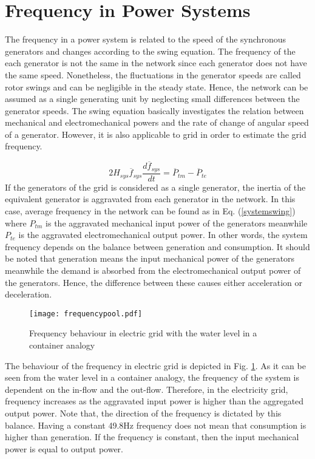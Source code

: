 \section{Frequency in Power Systems}
The frequency in a power system is related to the speed of the synchronous generators and changes according to the swing equation. The frequency of the each generator is not the same in the network since each generator does not have the same speed. Nonetheless, the fluctuations in the generator speeds are called rotor swings and can be negligible in the steady state. Hence, the network can be assumed as a single generating unit by neglecting small differences between the generator speeds. The swing equation basically investigates the relation between mechanical and electromechanical powers and the rate of change of angular speed of a generator. However, it is also applicable to grid in order to estimate the grid frequency.\par
\begin{equation}
\label{systemswing}
2H_{sys}\overline{f}_{sys}\frac{d\overline{f}_{sys}}{dt}=\overline{P}_{tm}-\overline{P}_{te}
\end{equation}
If the generators of the grid is considered as a single generator, the inertia of the equivalent generator is aggravated from each generator in the network. In this case, average frequency in the network can be found as in Eq. (\ref{systemswing}) where $P_{tm}$ is the aggravated mechanical input power of the generators meanwhile $P_{te}$ is the aggravated electromechanical output power. In other words, the system frequency depends on the balance between generation and consumption. It should be noted that generation means the input mechanical power of the generators meanwhile the demand is absorbed from the electromechanical output power of the generators. Hence, the difference between these causes either acceleration or deceleration. \par
\begin{figure}[h!]
	\centering
	\texttt{[image: frequencypool.pdf]}
	\caption{Frequency behaviour in electric grid with the water level in a container analogy \cite{Eto2010}}
	\label{frequencyingrid}
\end{figure}
The behaviour of the frequency in electric grid is depicted in Fig. \ref{frequencyingrid}. As it can be seen from the water level in a container analogy, the frequency of the system is dependent on the in-flow and the out-flow. Therefore, in the electricity grid, frequency increases as the aggravated input power is higher than the aggregated output power. Note that, the direction of the frequency is dictated by this balance. Having a constant 49.8Hz frequency does not mean that consumption is higher than generation. If the frequency is constant, then the input mechanical power is equal to output power.
